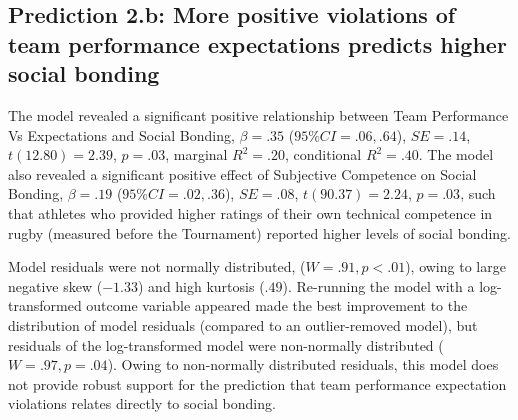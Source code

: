 \begin{CJK}{UTF8}{gbsn}
\subsection{Prediction 2.b: More positive violations of team performance expectations predicts higher social bonding}

The model revealed a significant positive relationship between Team Performance Vs Expectations and Social Bonding, $\beta = .35$ ($95\% CI = .06, .64$), $SE = .14$, $t(12.80) = 2.39$, $p = .03$, marginal $R^2 = .20$, conditional $R^2 = .40$.  The model also revealed a significant positive effect of Subjective Competence on Social Bonding, $\beta = .19$ ($95\% CI =  .02, .36$), $SE = .08$, $t(90.37) = 2.24$, $p = .03$, such that athletes who provided higher ratings of their own technical competence in rugby (measured before the Tournament) reported higher levels of social bonding.

Model residuals were not normally distributed, ($W = .91, p < .01$), owing to large negative skew ($-1.33$) and high kurtosis ($.49$). Re-running the model with a log-transformed outcome variable appeared made the best improvement to the distribution of model residuals (compared to an outlier-removed model), but residuals of the log-transformed model were non-normally distributed ($W = .97, p = .04$).  Owing to non-normally distributed residuals, this model does not provide robust support for the prediction that team performance expectation violations relates directly to social bonding.





\end{CJK}

